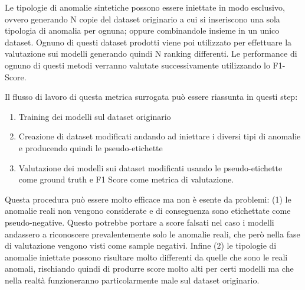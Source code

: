 Le tipologie di anomalie sintetiche possono essere iniettate in modo esclusivo, ovvero generando N copie del dataset originario a cui si inseriscono una sola tipologia di anomalia per ognuna; oppure combinandole insieme in un unico dataset. 
Ognuno di questi dataset prodotti viene poi utilizzato per effettuare la valutazione sui modelli generando quindi N ranking differenti. Le performance di ognuno di questi metodi verranno valutate successivamente utilizzando lo F1-Score.

Il flusso di lavoro di questa metrica surrogata può essere riassunta in questi step:
\begin{enumerate}
	\item Training dei modelli sul dataset originario
	\item Creazione di dataset modificati andando ad iniettare i diversi tipi di anomalie e producendo quindi le pseudo-etichette
	\item Valutazione dei modelli sui dataset modificati usando le pseudo-etichette come ground truth e F1 Score come metrica di valutazione.
\end{enumerate}


Questa procedura può essere molto efficace ma non è esente da problemi: (1) le anomalie reali non vengono considerate e di conseguenza sono etichettate come pseudo-negative. Questo potrebbe portare a score falsati nel caso i modelli andassero a riconoscere prevalentemente solo le anomalie reali, che però nella fase di valutazione vengono visti come sample negativi. Infine (2) le tipologie di anomalie iniettate possono risultare molto differenti da quelle che sono le reali anomali, rischiando quindi di produrre score molto alti per certi modelli ma che nella realtà funzioneranno particolarmente male sul dataset originario.

